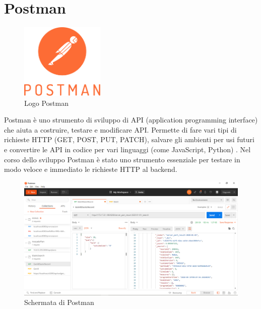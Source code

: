 \section{Postman}
\begin{figure}[ht!]
\begin{center}
  \includegraphics[width=4cm]{images/postman_logo.png}
  \caption{Logo Postman}
\end{center}
\end{figure}
Postman è uno strumento di sviluppo di API (application programming interface) che aiuta a costruire, testare e modificare API. Permette di fare vari tipi di richieste HTTP (GET, POST, PUT, PATCH), salvare gli ambienti per usi futuri e convertire le API in codice per vari linguaggi (come JavaScript, Python) \cite{POSTMAN}.
Nel corso dello sviluppo Postman è stato uno strumento essenziale per testare in modo veloce e immediato le richieste HTTP al backend.
\begin{figure}[ht!]
\begin{center}
  \includegraphics[width=15cm]{images/Postman.png}
  \caption{Schermata di Postman}
\end{center}
\end{figure}

\pagebreak
